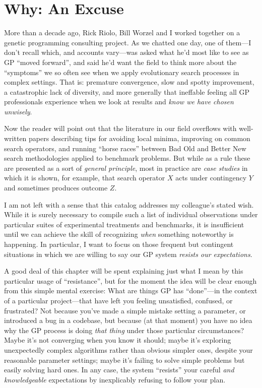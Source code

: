 
\section{Why: An Excuse}\hypertarget{why-an-excuse}{}\label{why-an-excuse}

More than a decade ago, Rick Riolo, Bill Worzel and I worked together on a genetic programming consulting project. As we chatted one day, one of them---I don't recall which, and accounts vary---was asked what he'd most like to see as GP ``moved forward'', and said he'd want the field to think more about the ``symptoms'' we so often see when we apply evolutionary search processes in complex settings. That is: premature convergence, slow and spotty improvement, a catastrophic lack of diversity, and more generally that ineffable feeling all GP professionals experience when we look at results and \emph{know we have chosen unwisely}.

Now the reader will point out that the literature in our field overflows with well-written papers describing tips for avoiding local minima, improving on common search operators, and running ``horse races'' between Bad Old and Better New search methodologies applied to benchmark problems. But while as a rule these are presented as a sort of \emph{general principle}, most in practice are \emph{case studies} in which it is shown, for example, that search operator $X$ acts under contingency $Y$ and sometimes produces outcome $Z$.

I am not left with a sense that this catalog addresses my colleague's stated wish. While it is surely necessary to compile such a list of individual observations under particular suites of experimental treatments and benchmarks, it is insufficient until we can achieve the skill of recognizing \emph{when} something noteworthy is happening. In particular, I want to focus on those frequent but contingent situations in which we are willing to say our GP system \emph{resists our expectations}.

A good deal of this chapter will be spent explaining just what I mean by this  particular usage of ``resistance'', but for the moment the idea will be clear enough from this simple mental exercise: What are things GP has ``done''---in the context of a particular project---that have left you feeling unsatisfied, confused, or frustrated? Not because you've made a simple mistake setting a parameter, or introduced a bug in a codebase, but because (at that moment) you have no idea why the GP process is doing \emph{that thing} under those particular circumstances? Maybe it's not converging when you know it should; maybe it's exploring unexpectedly complex algorithms rather than obvious simpler ones, despite your reasonable parameter settings; maybe it's failing to solve simple problems but easily solving hard ones. In any case, the system ``resists'' your careful \emph{and knowledgeable} expectations by inexplicably refusing to follow your plan.

